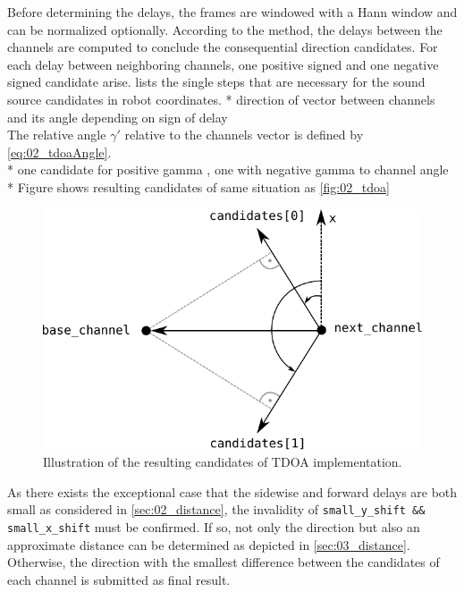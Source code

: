 Before determining the delays, the frames are windowed with a Hann window and can be
normalized optionally.
According to the method, the delays between the channels are computed to conclude the
consequential direction candidates.
For each delay between neighboring channels, one positive signed and one negative
signed candidate arise.
 lists the single steps that are necessary for the sound source
candidates in robot coordinates.
* direction of vector between channels and its angle depending on sign of delay\\
The relative angle $\gamma'$ relative to the channels vector is defined
by \cref{eq:02_tdoaAngle}.\\
* one candidate for positive gamma , one with negative gamma to channel angle\\
* Figure shows resulting candidates of same situation as \cref{fig:02_tdoa}
\begin{figure}[ht]
	\centering
		\includegraphics[width=0.6\columnwidth]{figures/tdoa_code}
	\caption{Illustration of the resulting candidates of \ac{TDOA} implementation.}
\end{figure}
\label{fig:03_tdoaCode}

As there exists the exceptional case that the sidewise and forward delays are both small
as considered in \cref{sec:02_distance}, the invalidity of
\lstinline!small_y_shift && small_x_shift! must be confirmed.
If so, not only the direction but also an approximate distance can be determined
as depicted in \cref{sec:03_distance}.
Otherwise, the direction with the smallest difference between the
candidates of each channel is submitted as final result.
